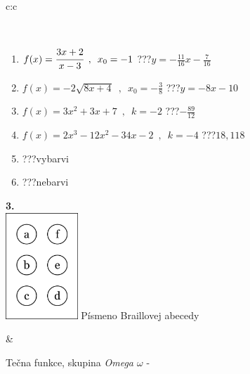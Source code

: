 \documentclass[10pt]{report}
\begin{document}
\begin{tabular}{c:c}
\begin{minipage}[c][104.5mm][t]{0.5\linewidth}
\begin{center}
\begin{minipage}{0.95\linewidth}
\end{minipage}
\\[1mm]
\begin{minipage}{0.79\linewidth}
\begin{center}
\begin{varwidth}{\linewidth}
\begin{enumerate}
\small
\item $f(x)=\cfrac{3x+2}{x-3}\enspace , \enspace x_0=-1$\quad \dotfill\; ???\;\dotfill \quad $y = -\frac{11}{16}x-\frac{7}{16}$
\item $f(x)=-2\sqrt{8x+4}\enspace , \enspace x_0=-\frac{3}{8}$\quad \dotfill\; ???\;\dotfill \quad $y = -8x-10$
\item $f(x)=3x^2+3x+7\enspace , \enspace k=-2$\quad \dotfill\; ???\;\dotfill \quad $-\frac{89}{12}$
\item $f(x)=2x^3-12x^2-34x-2\enspace , \enspace k=-4$\quad \dotfill\; ???\;\dotfill \quad $18 , 118$
\item \quad \dotfill\; ???\;\dotfill \quad vybarvi
\item \quad \dotfill\; ???\;\dotfill \quad nebarvi
\end{enumerate}
\end{varwidth}
\end{center}
\end{minipage}
\begin{minipage}{0.20\linewidth}
\begin{center}
{\Huge\bfseries 3.} \\[2mm]
\includegraphics[height=40mm]{../images/braille.png}
{\small Písmeno Braillovej abecedy}
\end{center}
\end{minipage}
\end{center}
\end{minipage}
&
\begin{minipage}[c][104.5mm][t]{0.5\linewidth}
\begin{center}
\vspace{7mm}
{\huge Tečna funkce, skupina \textit{Omega $\omega$} -}\\[5mm]

\end{center}
\end{minipage}
\end{tabular}
\end{document}
